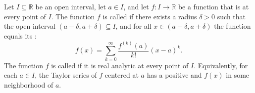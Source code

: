 \begin{definition} \label{definition:real_analytic_function_on_an_open_interval}
    Let $I \subseteq \mathbb{R}$ be an open interval, let $a \in I$, and let $f : I \to \mathbb{R}$ be a function that is  at every point of $I$. The function $f$ is called  if there exists a radius $\delta > 0$ such that the open interval $(a - \delta, a + \delta) \subseteq I$, and for all $x \in (a - \delta, a + \delta)$ the function equals its :
    $$f(x) = \sum_{k=0}^\infty \frac{f^{(k)}(a)}{k!}(x - a)^k.$$
    The function $f$ is called  if it is real analytic at every point of $I$. Equivalently, for each $a \in I$, the Taylor series of $f$ centered at $a$ has a positive  and  $f(x)$ in some neighborhood of $a$.
\end{definition}
